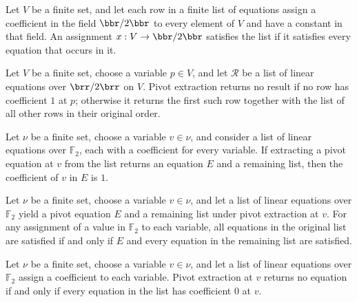 \begin{definition}
\leanok
{}
Let $V$ be a finite set, and let each row in a finite list of equations assign a
coefficient in the field $\bbr/2\bbr$ to every element of $V$ and have a constant in that
field. An assignment $x:V\to\bbr/2\bbr$ satisfies the list if it satisfies every
equation that occurs in it.
\end{definition}

\begin{definition}
\leanok
{}
Let $V$ be a finite set, choose a variable $p\in V$, and let $\mathcal R$ be a list of
linear equations over $\brr/2\brr$ on $V$. Pivot extraction returns no result if no row
has coefficient $1$ at $p$; otherwise it returns the first such row together with the
list of all other rows in their original order.
\end{definition}

\begin{theorem}
\leanok
{}
Let $\nu$ be a finite set, choose a variable $v\in\nu$, and consider a list of linear
equations over $\mathbb F_2$, each with a coefficient for every variable. If extracting
a pivot equation at $v$ from the list returns an equation $E$ and a remaining list, then
the coefficient of $v$ in $E$ is $1$.
\end{theorem}

\begin{theorem}
\leanok
{}
Let $\nu$ be a finite set, choose a variable $v\in\nu$, and let a list of linear
equations over $\mathbb F_2$ yield a pivot equation $E$ and a remaining list under pivot
extraction at $v$. For any assignment of a value in $\mathbb F_2$ to each variable, all
equations in the original list are satisfied if and only if $E$ and every equation in
the remaining list are satisfied.
\end{theorem}

\begin{theorem}
\leanok
{}
Let $\nu$ be a finite set, choose a variable $v\in\nu$, and let a list of linear
equations over $\mathbb F_2$ assign a coefficient to each variable. Pivot extraction at
$v$ returns no equation if and only if every equation in the list has coefficient $0$ at
$v$.
\end{theorem}

